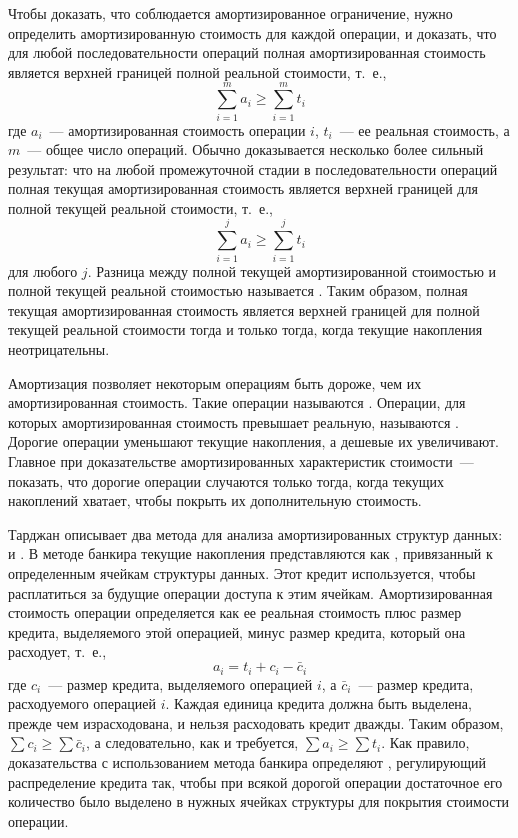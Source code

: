 Чтобы доказать, что соблюдается амортизированное ограничение, нужно
определить амортизированную стоимость для каждой операции, и доказать,
что для любой последовательности операций полная амортизированная
стоимость является верхней границей полной реальной стоимости, т.~е.,
$$
\sum_{i=1}^m a_i \ge \sum_{i=1}^m t_i
$$
где $a_i$~--- амортизированная стоимость операции $i$, $t_i$~--- ее
реальная стоимость, а $m$~--- общее число операций. Обычно
доказывается несколько более сильный результат: что на любой
промежуточной стадии в последовательности операций полная текущая
амортизированная стоимость является верхней границей для полной текущей
реальной стоимости, т.~е.,
$$
\sum_{i=1}^j a_i \ge \sum_{i=1}^j t_i
$$
для любого $j$. Разница между полной текущей амортизированной стоимостью
и полной текущей реальной стоимостью называется
. Таким образом, полная
текущая амортизированная стоимость является верхней границей для
полной текущей реальной стоимости тогда и только тогда, когда текущие
накопления неотрицательны.

Амортизация позволяет некоторым операциям быть дороже, чем их
амортизированная стоимость. Такие операции называются
. Операции, для которых амортизированная
стоимость превышает реальную, называются
. Дорогие операции уменьшают текущие накопления,
а дешевые их увеличивают. Главное при доказательстве
амортизированных характеристик стоимости~--- показать, что дорогие
операции случаются только тогда, когда текущих накоплений хватает,
чтобы покрыть их дополнительную стоимость.

Тарджан \cite{Tarjan1985} описывает два метода для анализа
амортизированных структур данных:  и . В методе банкира
текущие накопления представляются как ,
привязанный к определенным ячейкам структуры данных. Этот кредит
используется, чтобы расплатиться за будущие операции доступа к этим
ячейкам.  Амортизированная стоимость операции определяется как ее
реальная стоимость плюс размер кредита, выделяемого этой операцией,
минус размер кредита, который она расходует, т.~е.,
$$
a_i = t_i + c_i - \bar{c}_i
$$
где $c_i$~--- размер кредита, выделяемого операцией $i$, а $\bar{c}_i$~---
размер кредита, расходуемого операцией $i$. Каждая единица кредита
должна быть выделена, прежде чем израсходована, и нельзя расходовать
кредит дважды. Таким образом, $\sum c_i \ge \sum \bar{c}_i$, а
следовательно, как и требуется, $\sum a_i \ge \sum t_i$. Как правило,
доказательства с использованием метода банкира определяют
, регулирующий распределение
кредита так, чтобы при всякой дорогой операции достаточное его
количество было выделено в нужных ячейках структуры для покрытия
стоимости операции.

